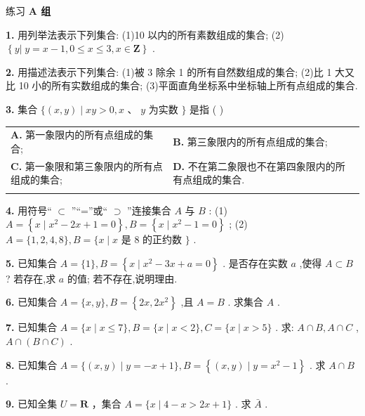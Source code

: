 \documentclass[a4paper,10pt,oneside,fontset=none]{ctexbook}
\renewcommand{\leq}{\leqslant}
\newenvironment{exercise}[1][]{\begin{exBox}{练习}{#1}}{\end{exBox}}
\numberwithin{equation}{chapter}
\begin{document}
\begin{exercise}
\textbf{A 组}\par\vspace{0.5em}
\textbf{1.} 用列举法表示下列集合: (1)10 以内的所有素数组成的集合; (2) $\left\{  {y\left| {\;y = x - 1}\right. ,0 \leq  x \leq  3, x \in  \mathbf{Z}}\right\}$ .
\par\vspace{0.8em}
\textbf{2.} 用描述法表示下列集合: (1)被 3 除余 1 的所有自然数组成的集合; (2)比 1 大又比 10 小的所有实数组成的集合; (3)平面直角坐标系中坐标轴上所有点组成的集合.
\par\vspace{0.8em}
\textbf{3.} 集合 $\{ \left( {x, y}\right)  \mid  {xy} > 0, x\text{ 、 }y$ 为实数 $\}$ 是指 ( )
\par\vspace{0.3em}
\begin{center}
\begin{tabular}{@{}p{}p{}@{}}
\textbf{A.} 第一象限内的所有点组成的集合; & \textbf{B.} 第三象限内的所有点组成的集合; \\\vspace{0.2em}
\textbf{C.} 第一象限和第三象限内的所有点组成的集合; & \textbf{D.} 不在第二象限也不在第四象限内的所有点组成的集合. \\\vspace{0.2em}
\end{tabular}
\end{center}
\par\vspace{0.8em}
\textbf{4.} 用符号“ $\subset$ ”“=”或“ $\supset$ ”连接集合 $A$ 与 $B$ : (1) $A = \left\{  {x \mid  {x}^{2} - {2x} + 1 = 0}\right\}  , B = \left\{  {x \mid  {x}^{2} - 1 = 0}\right\}$ ; (2) $A = \{ 1,2,4,8\} , B = \{ x \mid  x$ 是 8 的正约数 $\}$ .
\par\vspace{0.8em}
\textbf{5.} 已知集合 $A = \{ 1\} , B = \left\{  {x \mid  {x}^{2} - {3x} + a = 0}\right\}$ . 是否存在实数 $a$ ,使得 $A \subset  B$ ? 若存在,求 $a$ 的值; 若不存在,说明理由.
\par\vspace{0.8em}
\textbf{6.} 已知集合 $A = \{ x, y\} , B = \left\{  {{2x},2{x}^{2}}\right\}$ ,且 $A = B$ . 求集合 $A$ .
\par\vspace{0.8em}
\textbf{7.} 已知集合 $A = \{ x \mid  x \leq  7\} , B = \{ x \mid  x < 2\} , C = \{ x \mid  x > 5\}$ . 求: $A \cap  B, A \cap  C$ , $A \cap  \left( {B \cap  C}\right)$ .
\par\vspace{0.8em}
\textbf{8.} 已知集合 $A = \{ \left( {x, y}\right)  \mid  y =  - x + 1\} , B = \left\{  {\left( {x, y}\right)  \mid  y = {x}^{2} - 1}\right\}$ . 求 $A \cap  B$ .
\par\vspace{0.8em}
\textbf{9.} 已知全集 $U = \mathbf{R}$ ，集合 $A = \{ x \mid  4 - x > {2x} + 1\}$ . 求 $\bar{A}$ .
\end{exercise}
\end{document}
